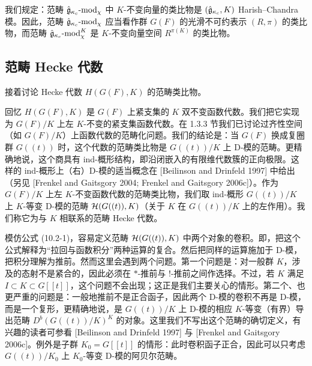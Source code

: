 我们规定：范畴 $\hat{\mathfrak{g}}_{\kappa_c}\text{-}\mathrm{mod}_\chi$ 中 $K$-不变向量的类比物是 $(\hat{\mathfrak{g}}_{\kappa_c},K)$ Harish--Chandra 模。因此，范畴 $\hat{\mathfrak{g}}_{\kappa_c}\text{-}\mathrm{mod}_\chi$ 应当看作群 $G(F)$ 的光滑不可约表示 $(R,\pi)$ 的类比物，而范畴 $\hat{\mathfrak{g}}_{\kappa_c}\text{-}\mathrm{mod}_\chi^K$ 是 $K$-不变向量空间 $R^{\pi(K)}$ 的类比物。

\subsection{范畴 Hecke 代数}

接着讨论 Hecke 代数 $H(G(F),K)$ 的范畴类比物。

回忆 $H(G(F),K)$ 是 $G(F)$ 上紧支集的 $K$ 双不变函数代数。我们把它实现为 $G(F)/K$ 上左 $K$-不变的紧支集函数代数。在 1.3.3 节我们已讨论过齐性空间（如 $G(F)/K$）上函数代数的范畴化问题。我们的结论是：当 $G(F)$ 换成复圈群 $G((t))$ 时，这个代数的范畴类比物是 $G((t))/K$ 上 D-模的范畴。更精确地说，这个商具有 ind-概形结构，即沿闭嵌入的有限维代数簇的正向极限。这样的 ind-概形上（右）D-模的适当概念在 [Beilinson and Drinfeld 1997] 中给出（另见 [Frenkel and Gaitsgory 2004; Frenkel and Gaitsgory 2006c]）。作为 $G(F)/K$ 上左 $K$-不变函数代数的范畴类比物，我们取 ind-概形 $G((t))/K$ 上 $K$-等变 D-模的范畴 $\mathcal{H}(G((t)),K)$（关于 $K$ 在 $G((t))/K$ 上的左作用）。我们称它为与 $K$ 相联系的范畴 Hecke 代数。

模仿公式 (10.2-1)，容易定义范畴 $\mathcal{H}(G((t)),K)$ 中两个对象的卷积。即，把这个公式解释为“拉回与函数积分”两种运算的复合。然后把同样的运算施加于 D-模，把积分理解为推前。然而这里会遇到两个问题。第一个问题是：对一般群 $K$，涉及的态射不是紧合的，因此必须在 $*$-推前与 $!$-推前之间作选择。不过，若 $K$ 满足 $I\subset K\subset G[[t]]$，这个问题不会出现；这正是我们主要关心的情形。第二个、也更严重的问题是：一般地推前不是正合函子，因此两个 D-模的卷积不再是 D-模，而是一个复形，更精确地说，是 $G((t))/K$ 上 D-模的相应 $K$-等变（有界）导出范畴 $D^b(G((t))/K)^K$ 的对象。这里我们不写出这个范畴的确切定义，有兴趣的读者可参看 [Beilinson and Drinfeld 1997] 与 [Frenkel and Gaitsgory 2006c]。例外是子群 $K_0=G[[t]]$ 的情形：此时卷积函子正合，因此可以只考虑 $G((t))/K_0$ 上 $K_0$-等变 D-模的阿贝尔范畴。

